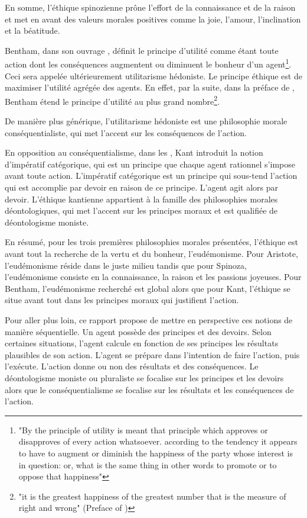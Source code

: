 En somme, l'éthique spinozienne prône l'effort de la connaissance et de la raison et met en avant des valeurs morales positives comme la joie, l'amour, l'inclination et la béatitude. 


Bentham, dans son ouvrage , définit le principe d'utilité comme étant toute action dont les conséquences augmentent ou diminuent le bonheur d'un agent\footnote{"By the principle of utility is meant that
principle which approves or disapproves of every action whatsoever.
according to the tendency it appears to have to augment or diminish the
happiness of the party whose interest is in question: or, what is the same
thing in other words to promote or to oppose that happiness"}. Ceci sera appelée ultérieurement utilitarisme hédoniste. Le principe éthique est de maximiser l'utilité agrégée des agents. En effet, par la suite, dans la préface de , Bentham étend le principe d'utilité au plus grand nombre\footnote{
"it is the greatest happiness of the greatest number that is the measure of right and wrong" (Preface of )}.

De manière plus générique, l'utilitarisme hédoniste est une philosophie morale conséquentialiste, qui met l'accent sur les conséquences de l'action.

En opposition au conséquentialisme, dans les , Kant introduit la notion d'impératif catégorique, qui est un principe que chaque agent rationnel s'impose avant toute action. L'impératif catégorique est un principe qui sous-tend l'action qui est accomplie par devoir en raison de ce principe. L'agent agit alors par devoir. L'éthique kantienne appartient à la famille des philosophies morales déontologiques, qui met l'accent sur les principes moraux et est qualifiée de déontologisme moniste.

En résumé, pour les trois premières philosophies morales présentées, l'éthique est avant tout la recherche de la vertu et du bonheur, l'eudémonisme. Pour Aristote, l'eudémonisme réside dans le juste milieu tandis que pour Spinoza, l'eudémonisme consiste en la connaissance, la raison et les passions joyeuses. Pour Bentham, l'eudémonisme recherché est global alors que pour Kant, l'éthique se situe avant tout dans les principes moraux qui justifient l'action.


Pour aller plus loin, ce rapport propose de mettre en perspective ces notions de manière séquentielle. Un agent possède des principes et des devoirs. Selon certaines situations, l'agent calcule en fonction de ses principes les résultats plausibles de son action. L'agent se prépare dans l'intention de faire l'action, puis l'exécute. L'action donne ou non des résultats et des conséquences. Le déontologisme moniste ou pluraliste se focalise sur les principes et les devoirs alors que le conséquentialisme se focalise sur les résultats et les conséquences de l'action.

